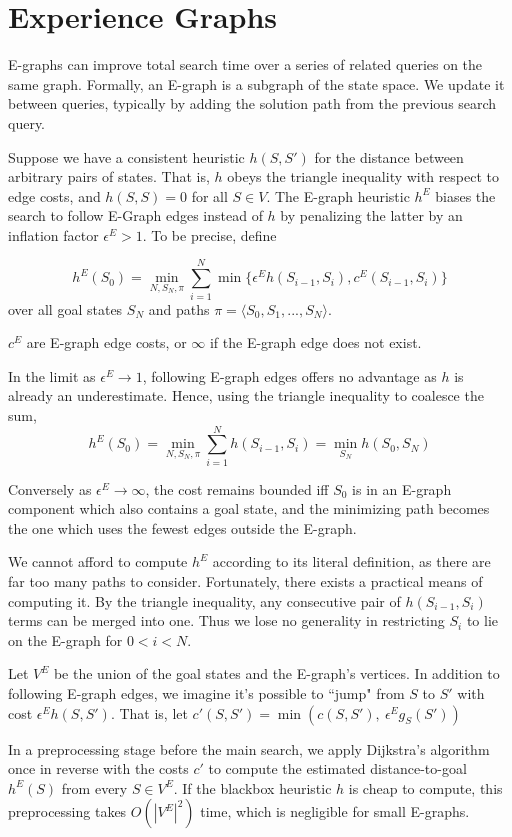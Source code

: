 \documentclass[letterpaper]{article}
\begin{document}
\section{Experience Graphs}

E-graphs can improve total search time over a series of related queries on the same graph.
Formally, an E-graph is a subgraph of the state space.
We update it between queries, typically by adding the solution path from the previous search query.

Suppose we have a consistent heuristic $h(S,S')$ for the distance between arbitrary pairs of states.
That is, $h$ obeys the triangle inequality with respect to edge costs, and $h(S,S) = 0$ for all $S\in V$.
The E-graph heuristic $h^E$ biases the search to follow E-Graph edges instead of $h$ by penalizing the latter by an inflation factor $\epsilon^E > 1$.
To be precise, define

\[h^E(S_0) = \min_{N,S_N,\pi} \sum_{i=1}^N \min \{\epsilon^E h(S_{i-1},S_i),c^E(S_{i-1},S_i)\}\]
over all goal states $S_N$ and paths $\pi = \langle S_0,S_1,...,S_N \rangle$.

$c^E$ are E-graph edge costs, or $\infty$ if the E-graph edge does not exist.

In the limit as $\epsilon^E \rightarrow 1$, following E-graph edges offers no advantage as $h$ is already an underestimate. Hence, using the triangle inequality to coalesce the sum,
\[h^E(S_0) = \min_{N,S_N,\pi} \sum_{i=1}^N h(S_{i-1},S_i) = \min_{S_N} h(S_0,S_N)\]

Conversely as $\epsilon^E \rightarrow\infty$, the cost remains bounded iff $S_0$ is in an E-graph component which also contains a goal state, and the minimizing path becomes the one which uses the fewest edges outside the E-graph.

We cannot afford to compute $h^E$ according to its literal definition, as there are far too many paths to consider. Fortunately, there exists a practical means of computing it. By the triangle inequality, any consecutive pair of $h(S_{i-1},S_i)$ terms can be merged into one. Thus we lose no generality in restricting $S_i$ to lie on the E-graph for $0 < i < N$.

Let $V^E$ be the union of the goal states and the E-graph's vertices.
In addition to following E-graph edges, we imagine it's possible to ``jump" from $S$ to $S'$ with cost $\epsilon^E h(S,S')$. That is, let $c'(S,S') = \min\left(c(S,S'),~\epsilon^E g_S(S')\right)$


In a preprocessing stage before the main search, we apply Dijkstra's algorithm once in reverse with the costs $c'$ to compute the estimated distance-to-goal $h^E(S)$ from every $S\in V^E$. If the blackbox heuristic $h$ is cheap to compute, this preprocessing takes $O(|V^E|^2)$ time, which is negligible for small E-graphs.
\end{document}
